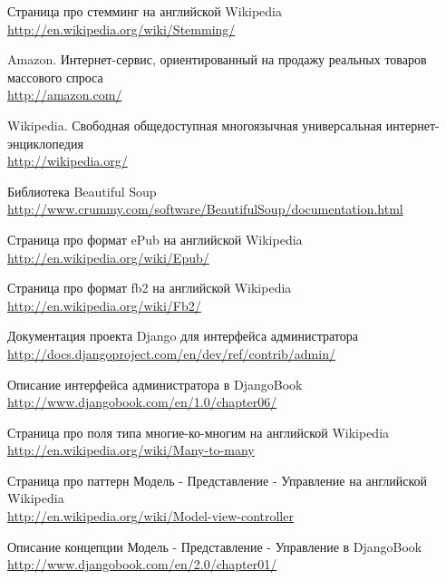 \begin{thebibliography}{99}
 Страница про стемминг на английской Wikipedia\\ \url{http://en.wikipedia.org/wiki/Stemming/}

 Amazon. Интернет-сервис, ориентированный на продажу реальных товаров массового спроса \\ \url{http://amazon.com/}

 Wikipedia. Свободная общедоступная многоязычная универсальная интернет-энциклопедия \\ \url{http://wikipedia.org/}

 Библиотека Beautiful Soup \\ \url{http://www.crummy.com/software/BeautifulSoup/documentation.html}

 Страница про формат ePub на английской Wikipedia\\ \url{http://en.wikipedia.org/wiki/Epub/}

 Страница про формат fb2 на английской Wikipedia\\ \url{http://en.wikipedia.org/wiki/Fb2/}

 Документация проекта Django для интерфейса администратора\\ \url{http://docs.djangoproject.com/en/dev/ref/contrib/admin/}

 Описание интерфейса администратора в DjangoBook\\ \url{http://www.djangobook.com/en/1.0/chapter06/}

 Страница про поля типа многие-ко-многим на английской Wikipedia\\ \url{http://en.wikipedia.org/wiki/Many-to-many}

 Страница про паттерн Модель - Представление - Управление на английской Wikipedia\\
\url{http://en.wikipedia.org/wiki/Model-view-controller}

 Описание концепции Модель - Представление - Управление в DjangoBook \\
\url{http://www.djangobook.com/en/2.0/chapter01/}
\end{thebibliography}
